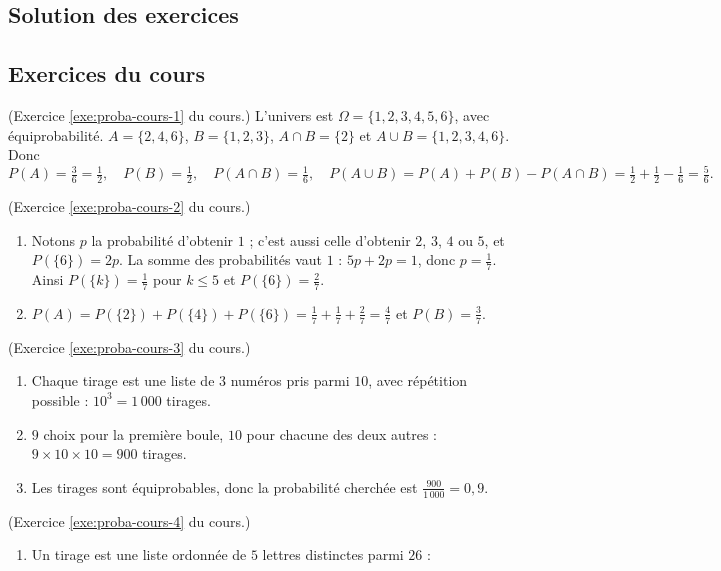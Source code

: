 \begin{corrige}
\section{Solution des exercices}
%
\subsection*{Exercices du cours}
\begin{sol} (Exercice \ref{exe:proba-cours-1} du cours.)
L'univers est $\Omega = \{1,2,3,4,5,6\}$, avec \'equiprobabilit\'e.
$A = \{2,4,6\}$, $B = \{1,2,3\}$, $A\cap B = \{2\}$ et $A\cup B = \{1,2,3,4,6\}$. Donc
\[
P(A) = \tfrac{3}{6} = \tfrac{1}{2},\quad P(B) = \tfrac{1}{2},\quad P(A\cap B) = \tfrac{1}{6},\quad
P(A\cup B) = P(A) + P(B) - P(A\cap B) = \tfrac{1}{2}+\tfrac{1}{2}-\tfrac{1}{6} = \tfrac{5}{6}.
\]
\end{sol}
%
\begin{sol} (Exercice \ref{exe:proba-cours-2} du cours.)
\begin{enumerate}
\item Notons $p$ la probabilit\'e d'obtenir $1$ ; c'est aussi celle d'obtenir $2$, $3$, $4$ ou $5$, et $P(\{6\}) = 2p$.
      La somme des probabilit\'es vaut $1$ : $5p + 2p = 1$, donc $p = \frac{1}{7}$.
      Ainsi $P(\{k\}) = \frac{1}{7}$ pour $k \leq 5$ et $P(\{6\}) = \frac{2}{7}$.
\item $P(A) = P(\{2\}) + P(\{4\}) + P(\{6\}) = \frac{1}{7} + \frac{1}{7} + \frac{2}{7} = \frac{4}{7}$ et
      $P(B) = \frac{3}{7}$.
\end{enumerate}
\end{sol}
%
\begin{sol} (Exercice \ref{exe:proba-cours-3} du cours.)
\begin{enumerate}
\item Chaque tirage est une liste de $3$ num\'eros pris parmi $10$, avec r\'ep\'etition possible : $10^3 = 1\,000$ tirages.
\item $9$ choix pour la premi\`ere boule, $10$ pour chacune des deux autres : $9\times 10\times 10 = 900$ tirages.
\item Les tirages sont \'equiprobables, donc la probabilit\'e cherch\'ee est $\frac{900}{1\,000} = 0,9$.
\end{enumerate}
\end{sol}
%
\begin{sol} (Exercice \ref{exe:proba-cours-4} du cours.)
\begin{enumerate}
\item Un tirage est une liste ordonn\'ee de $5$ lettres distinctes parmi $26$ :

\end{enumerate}
\end{sol}
\end{corrige}
